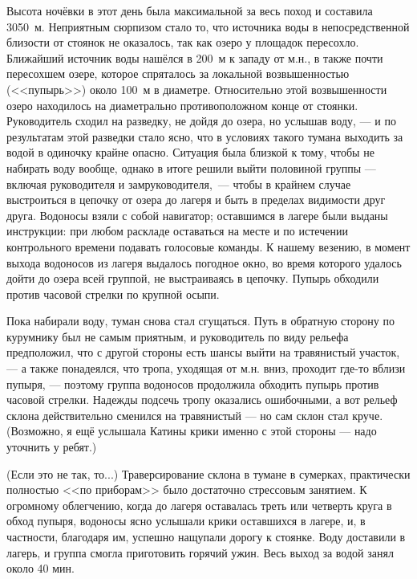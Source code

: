 Высота ночёвки в этот день была максимальной за весь поход и составила 3050~м. Неприятным сюрпизом стало то, что источника воды в непосредственной близости от стоянок не оказалось, так как озеро у площадок пересохло. Ближайший источник воды нашёлся в 200~м к западу от м.н., в также почти пересохшем озере, которое спряталось за локальной возвышенностью (<<пупырь>>) около 100~м в диаметре. Относительно этой возвышенности озеро находилось на диаметрально противоположном конце от стоянки. Руководитель сходил на разведку, не дойдя до озера, но услышав воду, --- и по результатам этой разведки стало ясно, что в условиях такого тумана выходить за водой в одиночку крайне опасно. Ситуация была близкой к тому, чтобы не набирать воду вообще, однако в итоге решили выйти половиной группы --- включая руководителя и замруководителя,~--- чтобы в крайнем случае выстроиться в цепочку от озера до лагеря и быть в пределах видимости друг друга. Водоносы взяли с собой навигатор; оставшимся в лагере были выданы инструкции: при любом раскладе оставаться на месте и по истечении контрольного времени подавать голосовые команды. К нашему везению, в момент выхода водоносов из лагеря выдалось погодное окно, во время которого удалось дойти до озера всей группой, не выстраиваясь в цепочку. Пупырь обходили против часовой стрелки по крупной осыпи. 

Пока набирали воду, туман снова стал сгущаться. Путь в обратную сторону по курумнику был не самым приятным, и руководитель по виду рельефа предположил, что с другой стороны есть шансы выйти на травянистый участок, --- а также понадеялся, что тропа, уходящая от м.н. вниз, проходит где-то вблизи пупыря, --- поэтому группа водоносов продолжила обходить пупырь против часовой стрелки. Надежды подсечь тропу оказались ошибочными, а вот рельеф склона действительно сменился на травянистый --- но сам склон стал круче.\alert{(Возможно, я ещё услышала Катины крики именно с этой стороны --- надо уточнить у ребят.)} 

\alert{(Если это не так, то...)} Траверсирование склона в тумане в сумерках, практически полностью <<по приборам>> было достаточно стрессовым занятием. К огромному облегчению, когда до лагеря оставалась треть или четверть круга в обход пупыря, водоносы ясно услышали крики оставшихся в лагере, и, в частности, благодаря им, успешно нащупали дорогу к стоянке. Воду доставили в лагерь, и группа смогла приготовить горячий ужин. Весь выход за водой занял около 40 мин.

